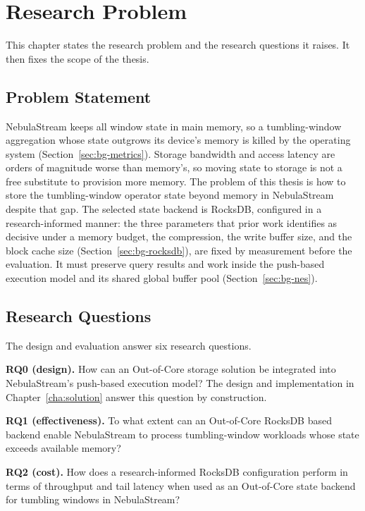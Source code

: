 \chapter{Research Problem\label{cha:problem}}

This chapter states the research problem and the research questions it raises.
It then fixes the scope of the thesis.

\section{Problem Statement\label{sec:goal}}

NebulaStream keeps all window state in main memory, so a tumbling-window aggregation whose state outgrows its device's memory is killed by the operating system (Section~\ref{sec:bg-metrics}).
Storage bandwidth and access latency are orders of magnitude worse than memory's, so moving state to storage is not a free substitute to provision more memory.
The problem of this thesis is how to store the tumbling-window operator state beyond memory in NebulaStream despite that gap.
The selected state backend is RocksDB, configured in a research-informed manner: the three parameters that prior work identifies as decisive under a memory budget, the compression, the write buffer size, and the block cache size (Section~\ref{sec:bg-rocksdb}), are fixed by measurement before the evaluation.
It must preserve query results and work inside the push-based execution model and its shared global buffer pool (Section~\ref{sec:bg-nes}).

\section{Research Questions\label{sec:rqs}}

The design and evaluation answer six research questions.

\textbf{RQ0 (design).}
How can an Out-of-Core storage solution be integrated into NebulaStream’s push-based execution model?
The design and implementation in Chapter~\ref{cha:solution} answer this question by construction.

\textbf{RQ1 (effectiveness).}
To what extent can an Out-of-Core RocksDB based backend enable NebulaStream to process tumbling-window workloads whose state exceeds available memory?

\textbf{RQ2 (cost).}
How does a research-informed RocksDB configuration perform in terms of throughput and tail latency when used as an Out-of-Core state backend for tumbling windows in NebulaStream?

